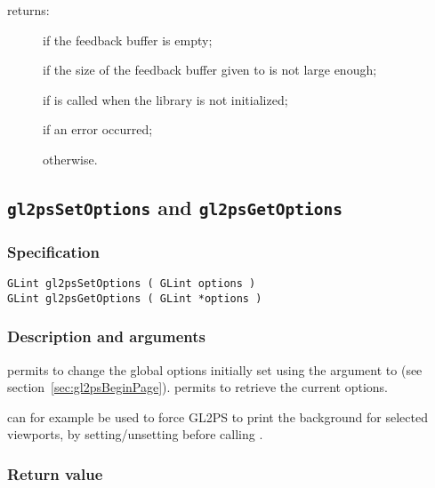 \noindent{} returns:
\begin{description}
\item[] if the feedback buffer is empty;
\item[] if the size of the feedback buffer given to
   is not large enough;
\item[] if  is called when the
  library is not initialized;
\item[] if an error occurred;
\item[] otherwise.
\end{description}


\subsection{\texttt{gl2psSetOptions} and \texttt{gl2psGetOptions}}
\label{sec:gl2psSetOptions}

\subsubsection{Specification}

\begin{verbatim}
GLint gl2psSetOptions ( GLint options )
GLint gl2psGetOptions ( GLint *options )
\end{verbatim}

\subsubsection{Description and arguments}

 permits to change the global options initially
set using the  argument to  (see
section~\ref{sec:gl2psBeginPage}).  permits to
retrieve the current options.

 can for example be used to force GL2PS to print
the background for selected viewports, by setting/unsetting
 before calling .

\subsubsection{Return value}

